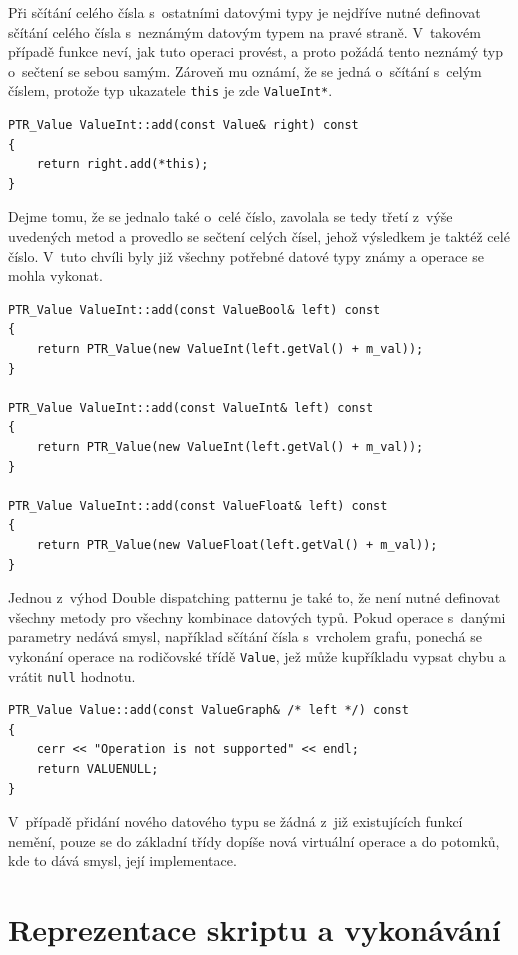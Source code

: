 \documentclass[11pt,twoside,a4paper]{book}
\begin{document}
Při sčítání celého čísla s~ostatními datovými typy je nejdříve nutné definovat sčítání celého čísla s~neznámým datovým typem na pravé straně. V~takovém případě funkce neví, jak tuto operaci provést, a proto požádá tento neznámý typ o~sečtení se sebou samým. Zároveň mu oznámí, že se jedná o~sčítání s~celým číslem, protože typ ukazatele \texttt{this} je zde \texttt{ValueInt*}.

\begin{verbatim}
PTR_Value ValueInt::add(const Value& right) const
{
    return right.add(*this);
}
\end{verbatim}

Dejme tomu, že se jednalo také o~celé číslo, zavolala se tedy třetí z~výše uvedených metod a provedlo se sečtení celých čísel, jehož výsledkem je taktéž celé číslo. V~tuto chvíli byly již všechny potřebné datové typy známy a operace se mohla vykonat.

\begin{verbatim}
PTR_Value ValueInt::add(const ValueBool& left) const
{
    return PTR_Value(new ValueInt(left.getVal() + m_val));
}

PTR_Value ValueInt::add(const ValueInt& left) const
{
    return PTR_Value(new ValueInt(left.getVal() + m_val));
}

PTR_Value ValueInt::add(const ValueFloat& left) const
{
    return PTR_Value(new ValueFloat(left.getVal() + m_val));
}
\end{verbatim}

Jednou z~výhod Double dispatching patternu je také to, že není nutné definovat všechny metody pro všechny kombinace datových typů. Pokud operace s~danými parametry nedává smysl, například sčítání čísla s~vrcholem grafu, ponechá se vykonání operace na rodičovské třídě \texttt{Value}, jež může kupříkladu vypsat chybu a vrátit \texttt{null} hodnotu.

\begin{verbatim}
PTR_Value Value::add(const ValueGraph& /* left */) const
{
    cerr << "Operation is not supported" << endl;
    return VALUENULL;
}
\end{verbatim}

V~případě přidání nového datového typu se žádná z~již existujících funkcí nemění, pouze se do základní třídy dopíše nová virtuální operace a do potomků, kde to dává smysl, její implementace.


\section{Reprezentace skriptu a vykonávání}
\end{document}
